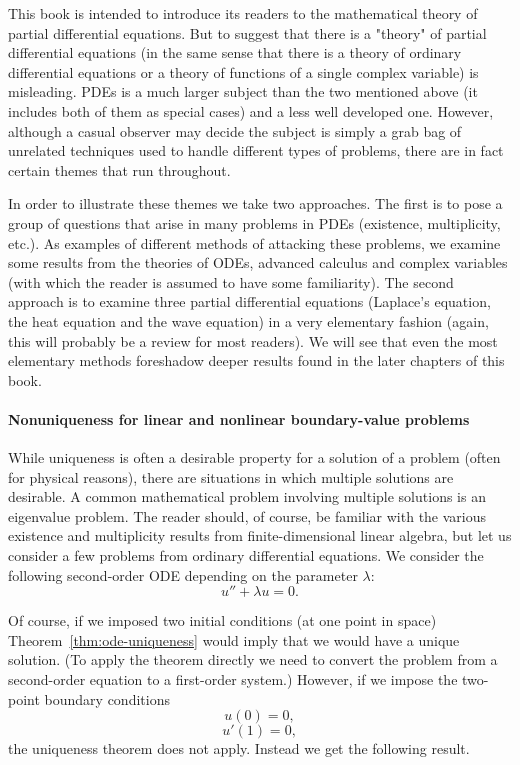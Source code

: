 This book is intended to introduce its readers to the mathematical theory of partial differential equations. But to suggest that there is a "theory" of partial differential equations (in the same sense that there is a theory of ordinary differential equations or a theory of functions of a single complex variable) is misleading. PDEs is a much larger subject than the two mentioned above (it includes both of them as special cases) and a less well developed one. However, although a casual observer may decide the subject is simply a grab bag of unrelated techniques used to handle different types of problems, there are in fact certain themes that run throughout.

In order to illustrate these themes we take two approaches. The first is to pose a group of questions that arise in many problems in PDEs (existence, multiplicity, etc.). As examples of different methods of attacking these problems, we examine some results from the theories of ODEs, advanced calculus and complex variables (with which the reader is assumed to have some familiarity). The second approach is to examine three partial differential equations (Laplace's equation, the heat equation and the wave equation) in a very elementary fashion (again, this will probably be a review for most readers). We will see that even the most elementary methods foreshadow deeper results found in the later chapters of this book.

\paragraph*{Nonuniqueness for linear and nonlinear boundary-value problems}

While uniqueness is often a desirable property for a solution of a problem (often for physical reasons), there are situations in which multiple solutions are desirable. A common mathematical problem involving multiple solutions is an eigenvalue problem. The reader should, of course, be familiar with the various existence and multiplicity results from finite-dimensional linear algebra, but let us consider a few problems from ordinary differential equations. We consider the following second-order ODE depending on the parameter $\lambda$:
\begin{equation}\label{eq:linear-mixed-boundary-ode}
u''+\lambda u=0.
\end{equation}

Of course, if we imposed two initial conditions (at one point in space) Theorem~\ref{thm:ode-uniqueness} would imply that we would have a unique solution. (To apply the theorem directly we need to convert the problem from a second-order equation to a first-order system.) However, if we impose the two-point boundary conditions
\begin{equation}\label{eq:linear-mixed-dirichlet}
u(0)=0,
\end{equation}
\begin{equation}\label{eq:linear-mixed-neumann}
u'(1)=0,
\end{equation}
the uniqueness theorem does not apply. Instead we get the following result.

